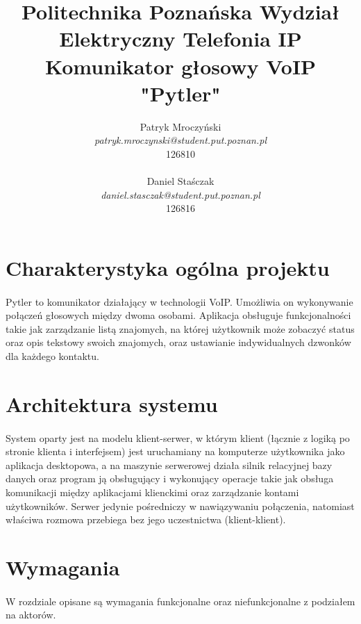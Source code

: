 \documentclass{article}
\title{\Huge{
  \indexspace \textbf{Politechnika Poznańska Wydział Elektryczny}  \indexspace Telefonia IP \indexspace Komunikator głosowy VoIP \indexspace \textbf{"Pytler"}}}
\author{Patryk Mroczyński \\ \textit{patryk.mroczynski@student.put.poznan.pl} \\126810\\
        \\
        Daniel Staśczak \\ \textit{daniel.stasczak@student.put.poznan.pl} \\126816 \\}
\begin{document}
  \maketitle
  \newpage
  \tableofcontents
  \newpage

  \section{Charakterystyka ogólna projektu}
  \paragraph{} Pytler to komunikator działający w technologii VoIP. Umożliwia on wykonywanie połączeń głosowych między dwoma osobami. Aplikacja obsługuje funkcjonalności takie jak zarządzanie listą znajomych, na której użytkownik może zobaczyć status oraz opis tekstowy swoich znajomych, oraz ustawianie indywidualnych dzwonków dla każdego kontaktu.
  \section{Architektura systemu}
  \paragraph{} System oparty jest na modelu klient-serwer, w którym klient (łącznie z logiką po stronie klienta i interfejsem) jest uruchamiany na komputerze użytkownika jako aplikacja desktopowa, a na maszynie serwerowej działa silnik relacyjnej bazy danych oraz program ją obsługujący i wykonujący operacje takie jak obsługa komunikacji między aplikacjami klienckimi oraz zarządzanie kontami użytkowników.
  Serwer jedynie pośredniczy w nawiązywaniu połączenia, natomiast właściwa rozmowa przebiega bez jego uczestnictwa (klient-klient).
  \section{Wymagania}
  \paragraph{} W rozdziale opisane są wymagania funkcjonalne oraz niefunkcjonalne z podziałem na aktorów.
\end{document}
